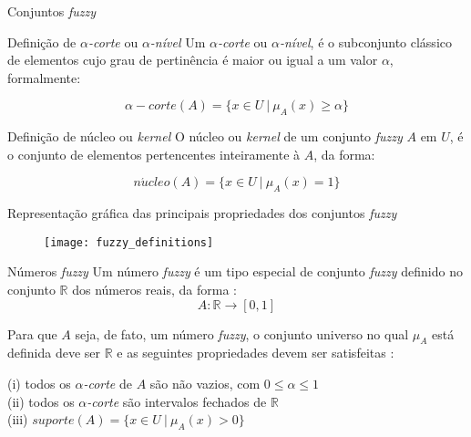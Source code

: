 \begin{frame}{Conjuntos \emph{fuzzy}}

\begin{block}{Definição de $\alpha$\emph{-corte} ou $\alpha$\emph{-nível}}
Um $\alpha$\emph{-corte} ou $\alpha$\emph{-nível}, é o subconjunto clássico de elementos cujo grau de pertinência é maior ou igual a um valor $\alpha$, formalmente:

\begin{equation*}
  \alpha-corte(A) = \{x \in U \ |\ \mu_A(x) \geq \alpha \}
\end{equation*}
\end{block}

\begin{block}{Definição de núcleo ou \emph{kernel}}
O núcleo ou \emph{kernel} de um conjunto \emph{fuzzy} $A$ em $U$, é o conjunto de elementos pertencentes inteiramente à $A$, da forma:

\begin{equation*}
  n\acute{u}cleo(A) = \{x \in U \ |\ \mu_A(x) = 1 \}
\end{equation*}
\end{block}

\end{frame}

\begin{frame}{Representação gráfica das principais propriedades dos conjuntos \emph{fuzzy}}
\begin{figure}[!h]
  \centering
  \texttt{[image: fuzzy\_definitions]}
\end{figure}
\end{frame}

\begin{frame}{Números \emph{fuzzy}}
Um número \emph{fuzzy} é um tipo especial de conjunto \emph{fuzzy} definido no conjunto $\mathbb{R}$ dos números reais, da forma \citep{klir:95}:
\begin{equation*}
  A : \mathbb{R} \rightarrow [0, 1]
\end{equation*}

Para que $A$ seja, de fato, um número \emph{fuzzy}, o conjunto universo no qual $\mu_A$ está definida deve ser $\mathbb{R}$ e as seguintes propriedades devem ser satisfeitas \citep{barros:06}:

\hspace{4pt}(i) todos os $\alpha$\emph{-corte} de $A$ são não vazios, com $0 \leq \alpha \leq 1$\\
\hspace{2pt}(ii) todos os $\alpha$\emph{-corte} são intervalos fechados de $\mathbb{R}$\\
(iii) $suporte(A) = \{x \in U \ |\ \mu_A(x) > 0\}$

\end{frame}

